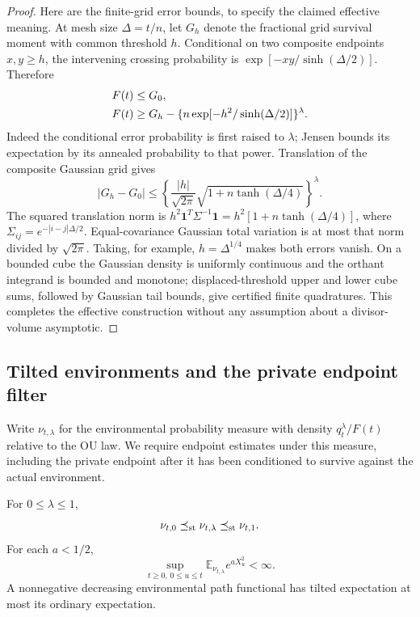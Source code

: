 \begin{proof}
Here are the finite-grid error bounds, to specify the claimed effective
meaning. At mesh size $\Delta=t/n$, let $G_h$ denote the fractional grid
survival moment with common threshold $h$. Conditional on two composite
endpoints $x,y\ge h$, the intervening crossing probability is
$\exp[-xy/\sinh(\Delta/2)]$. Therefore
\begin{align}
 F(t)&\le G_0,\notag\\
 F(t)&\ge G_h-
       \{n\exp[-h^2/\sinh(\Delta/2)]\}^{\lambda}.            \label{pr:griderror}
\end{align}
Indeed the conditional error probability is first raised to $\lambda$;
Jensen bounds its expectation by its annealed probability to that power.
Translation of the composite Gaussian grid gives
\begin{equation}
 |G_h-G_0|\le
 \left\{\frac{|h|}{\sqrt{2\pi}}
             \sqrt{1+n\tanh(\Delta/4)}\right\}^{\lambda}.
 \label{pr:gridthreshold}
\end{equation}
The squared translation norm is
$h^2\boldsymbol1^T\Sigma^{-1}\boldsymbol1
=h^2[1+n\tanh(\Delta/4)]$, where
$\Sigma_{ij}=e^{-|i-j|\Delta/2}$. Equal-covariance Gaussian total
variation is at most that norm divided by $\sqrt{2\pi}$.
Taking, for example, $h=\Delta^{1/4}$ makes both errors vanish.
On a bounded cube the Gaussian density is uniformly continuous and the
orthant integrand is bounded and monotone; displaced-threshold upper and
lower cube sums, followed by Gaussian tail bounds, give certified finite
quadratures. This completes the effective construction without any
assumption about a divisor-volume asymptotic.
\end{proof}

\subsection{Tilted environments and the private endpoint filter}

Write $\nu_{t,\lambda}$ for the environmental probability measure with
density $q_t^\lambda/F(t)$ relative to the OU law. We require endpoint
estimates under this measure, including the private endpoint after it
has been conditioned to survive against the actual environment.

\begin{lemma}\label{pr:order}
For $0\le\lambda\le1$,
\begin{equation}
 \nu_{t,0}\preceq_{\rm st}\nu_{t,\lambda}
                         \preceq_{\rm st}\nu_{t,1}.          \label{pr:storder}
\end{equation}
For each $a<1/2$,
\begin{equation}
 \sup_{t\ge0,\,0\le u\le t}
      \mathbb E_{\nu_{t,\lambda}}e^{aX_u^2}<\infty.          \label{pr:envmoment}
\end{equation}
A nonnegative decreasing environmental path functional has tilted
expectation at most its ordinary expectation.
\end{lemma}


